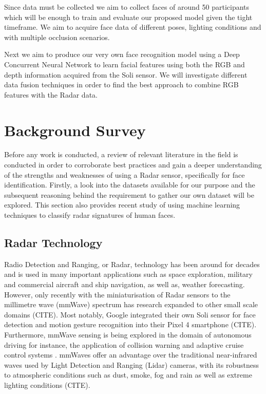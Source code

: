 \documentclass{interim}
\begin{document}
Since data must be collected we aim to collect faces of around 50 participants which will be enough to train and evaluate our proposed model given the tight timeframe. We aim to acquire face data of different poses, lighting conditions and with multiple occlusion scenarios.

Next we aim to produce our very own face recognition model using a Deep Concurrent Neural Network to learn facial features using both the RGB and depth information acquired from the Soli sensor. We will investigate different data fusion techniques in order to find the best approach to combine RGB features with the Radar data.



\section{Background Survey}
Before any work is conducted, a review of relevant literature in the field is conducted in order to corroborate best practices and gain a deeper understanding of the strengths and weaknesses of using a Radar sensor, specifically for face identification. Firstly, a look into the datasets available for our purpose and the subsequent reasoning behind the requirement to gather our own dataset will be explored. This section also provides recent study of using machine learning techniques to classify radar signatures of human faces. 

\subsection{Radar Technology}
Radio Detection and Ranging, or Radar, technology has been around for decades and is used in many important applications such as space exploration, military and commercial aircraft and ship navigation, as well as, weather forecasting. However, only recently with the miniaturisation of Radar sensors to the millimetre wave (mmWave) spectrum has research expanded to other small scale domains \cite{}(CITE). Most notably, Google integrated their own Soli sensor for face detection and motion gesture recognition into their Pixel 4 smartphone \cite{}(CITE). Furthermore, mmWave sensing is being explored in the domain of autonomous driving for instance, the application of collision warning and adaptive cruise control systems \cite{dfrobot}. mmWaves offer an advantage over the traditional near-infrared waves used by Light Detection and Ranging (Lidar) cameras, with its robustness to atmospheric conditions such as dust, smoke, fog and rain as well as extreme lighting conditions \cite{}(CITE).
\end{document}
